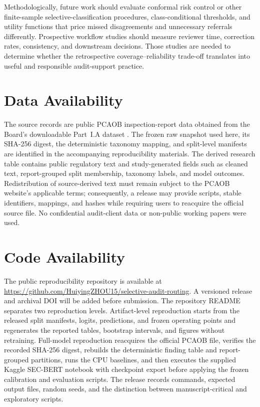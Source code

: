 \documentclass[11pt]{article}
\begin{document}
Methodologically, future work should evaluate conformal risk control or other
finite-sample selective-classification procedures, class-conditional thresholds,
and utility functions that price missed disagreements and unnecessary referrals
differently. Prospective workflow studies should measure reviewer time,
correction rates, consistency, and downstream decisions. Those studies are
needed to determine whether the retrospective coverage--reliability trade-off
translates into useful and responsible audit-support practice.

\section*{Data Availability}

The source records are public PCAOB inspection-report data obtained from the
Board's downloadable Part~I.A dataset \cite{pcaob2025datasets}. The frozen raw
snapshot used here, its SHA-256 digest, the deterministic taxonomy mapping, and
split-level manifests are identified in the accompanying reproducibility
materials. The derived research table contains public regulatory text and
study-generated fields such as cleaned text, report-grouped split membership,
taxonomy labels, and model outcomes. Redistribution of source-derived text must
remain subject to the PCAOB website's applicable terms; consequently, a release
may provide scripts, stable identifiers, mappings, and hashes while requiring
users to reacquire the official source file. No confidential audit-client data
or non-public working papers were used.

\section*{Code Availability}

The public reproducibility repository is available at
\url{https://github.com/HuiyingZHOU15/selective-audit-routing}. A versioned
release and archival DOI will be added before submission. The repository README separates two
reproduction levels. Artifact-level reproduction starts from the released split
manifests, logits, predictions, and frozen operating points and regenerates the
reported tables, bootstrap intervals, and figures without retraining. Full-model
reproduction reacquires the official PCAOB file, verifies the recorded SHA-256
digest, rebuilds the deterministic finding table and report-grouped partitions,
runs the CPU baselines, and then executes the supplied Kaggle SEC-BERT notebook
with checkpoint export before applying the frozen calibration and evaluation
scripts. The release records commands, expected output files, random seeds, and
the distinction between manuscript-critical and exploratory scripts.
\end{document}

